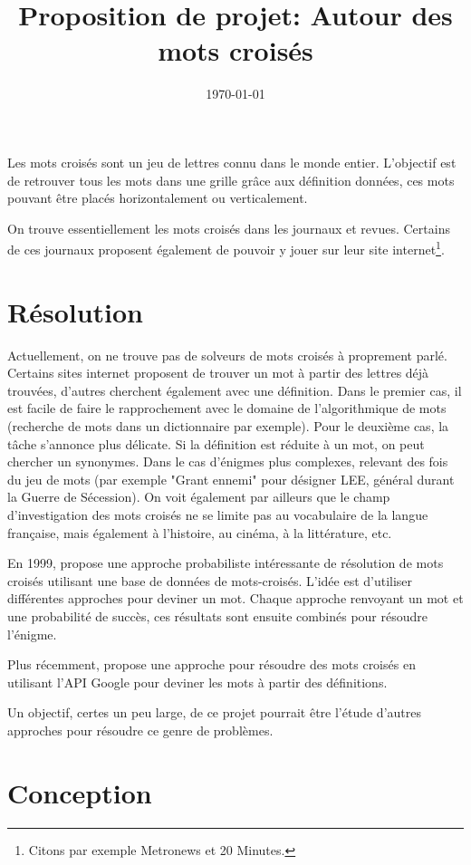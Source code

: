 \documentclass{article}
\title{Proposition de projet: Autour des mots croisés}
\author{}
\date{\today}
\begin{document}
\maketitle

Les mots croisés sont un jeu de lettres connu dans le monde entier. L'objectif est de retrouver tous les mots dans une grille grâce aux définition données, ces mots pouvant être placés horizontalement ou verticalement.

On trouve essentiellement les mots croisés dans les journaux et revues. Certains de ces journaux proposent également de pouvoir y jouer sur leur site internet\footnote{Citons par exemple Metronews et 20 Minutes.}.

\section{Résolution}

Actuellement, on ne trouve pas de solveurs de mots croisés à proprement parlé. Certains sites internet proposent de trouver un mot à partir des lettres déjà trouvées, d'autres cherchent également avec une définition. Dans le premier cas, il est facile de faire le rapprochement avec le domaine de l'algorithmique de mots (recherche de mots dans un dictionnaire par exemple). Pour le deuxième cas, la tâche s'annonce plus délicate. Si la définition est réduite à un mot, on peut chercher un synonymes. Dans le cas d'énigmes plus complexes, relevant des fois du jeu de mots (par exemple "Grant ennemi" pour désigner LEE, général durant la Guerre de Sécession). On voit également par ailleurs que le champ d'investigation des mots croisés ne se limite pas au vocabulaire de la langue française, mais également à l'histoire, au cinéma, à la littérature, etc.

En 1999, \cite{proverb} propose une approche probabiliste intéressante de résolution de mots croisés utilisant une base de données de mots-croisés. L'idée est d'utiliser différentes approches pour deviner un mot. Chaque approche renvoyant un mot et une probabilité de succès, ces résultats sont ensuite combinés pour résoudre l'énigme.

Plus récemment, \cite{GCV} propose une approche pour résoudre des mots croisés en utilisant l'API Google pour deviner les mots à partir des définitions.

Un objectif, certes un peu large, de ce projet pourrait être l'étude d'autres approches pour résoudre ce genre de problèmes.

\section{Conception}
\end{document}
